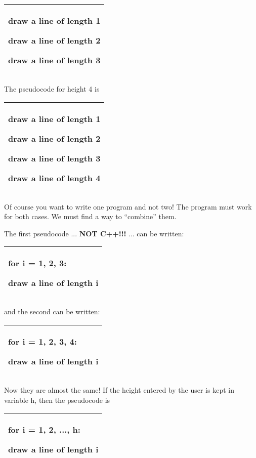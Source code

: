 \documentclass[
]{article}
\begin{document}
\begin{longtable}[]{@{}l@{}}
\toprule
\endhead
\begin{minipage}[t]{0.97\columnwidth}\raggedright
draw a line of length 1

draw a line of length 2

draw a line of length 3\strut
\end{minipage}\tabularnewline
\bottomrule
\end{longtable}

The pseudocode for height 4 is

\begin{longtable}[]{@{}l@{}}
\toprule
\endhead
\begin{minipage}[t]{0.97\columnwidth}\raggedright
draw a line of length 1

draw a line of length 2

draw a line of length 3

draw a line of length 4\strut
\end{minipage}\tabularnewline
\bottomrule
\end{longtable}

Of course you want to write one program and not two! The program must
work for both cases. We must find a way to ``combine'' them.

The first pseudocode ... \textbf{NOT C++!!!} ... can be written:

\begin{longtable}[]{@{}l@{}}
\toprule
\endhead
\begin{minipage}[t]{0.97\columnwidth}\raggedright
for i = 1, 2, 3:

draw a line of length i\strut
\end{minipage}\tabularnewline
\bottomrule
\end{longtable}

and the second can be written:

\begin{longtable}[]{@{}l@{}}
\toprule
\endhead
\begin{minipage}[t]{0.97\columnwidth}\raggedright
for i = 1, 2, 3, 4:

draw a line of length i\strut
\end{minipage}\tabularnewline
\bottomrule
\end{longtable}

Now they are almost the same! If the height entered by the user is kept
in variable h, then the pseudocode is

\begin{longtable}[]{@{}l@{}}
\toprule
\endhead
\begin{minipage}[t]{0.97\columnwidth}\raggedright
for i = 1, 2, ..., h:

draw a line of length i\strut
\end{minipage}\tabularnewline
\bottomrule
\end{longtable}
\end{document}
